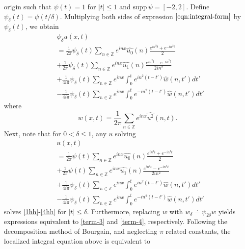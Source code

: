 \documentclass[12pt,reqno]{amsart}
\numberwithin{equation}{section}  %
\newcommand{\zz}{\mathbb{Z}}
\newcommand{\wh}{\widehat}
\begin{document}
origin such that $\psi(t) = 1$ for $|t| \le 1$ and $\text{supp} \, \psi 
= [-2, 2 ]$.
Define $\psi_{\delta}(t) = \psi(t/\delta)$.  Multiplying both sides of expression
$\eqref{eqn:integral-form}$ by $\psi_{\delta}(t)$, we obtain
%
%
\begin{align}
  & \psi_{\delta}u(x,t) 
  \label{1hh}
    \\
    & = \frac{1}{2 \pi}\psi_{\delta}(t)
    \sum_{n \in \zz} e^{inx} \wh{u_{0}}(n) \frac{e^{in^{2}t} + e^{-in^{2}t}}{2} 
    \\
    \label{2hh}
    & + \frac{1}{2 \pi}\psi_{\delta}(t) \sum_{n \in \zz} e^{inx}
    \wh{u_{1}}(n)\frac{e^{in^{2}t} - e^{-in^{2}t}}{2 i n^{2}} 
    \\
    \label{3hh}
    & + \frac{1}{4 i \pi}\psi_{\delta}(t) \sum_{n \in \zz} e^{inx}
    \int_{0}^{t}e^{in^{2}(t-t')}
    \wh{w}(n, t') dt'
    \\
    \label{4hh}
    & - \frac{1}{4 i \pi}\psi_{\delta}(t) \sum_{n \in \zz} e^{inx}
    \int_{0}^{t}e^{-in^{2}(t-t')}
    \wh{w}(n, t') dt'
  \end{align}
where $$w(x,t) = \frac{1}{2\pi} \sum_{n \in \zz}
e^{inx} \wh{u^{2}}(n,t).$$  Next, note that for $0 < \delta \le 1$, any $u$
solving
\begin{align}
  & u(x,t) 
    \\
    & = \frac{1}{2 \pi}\psi(t)
    \sum_{n \in \zz} e^{inx} \wh{u_{0}}(n) \frac{e^{in^{2}t} + e^{-in^{2}t}}{2} 
    \\
    & + \frac{1}{2 \pi}\psi(t) \sum_{n \in \zz} e^{inx}
    \wh{u_{1}}(n)\frac{e^{in^{2}t} - e^{-in^{2}t}}{2 i n^{2}} 
    \\
    \label{term-3}
    & + \frac{1}{4 i \pi} \psi_{\delta}(t) \sum_{n \in \zz} e^{inx}
    \int_{0}^{t}e^{in^{2}(t-t')}
    \wh{w}(n, t') dt'
    \\
    \label{term-4}
    & - \frac{1}{4 i \pi} \psi_{\delta} (t) \sum_{n \in \zz} e^{inx}
    \int_{0}^{t}e^{-in^{2}(t-t')}
    \wh{w}(n, t') dt'
  \end{align}
  solves \eqref{1hh}-\eqref{4hh} for $| t | \le \delta$. Furthermore, replacing
  $w$ with $w_{\delta} \doteq \psi_{2 \delta} w$ yields expressions equivalent
  to \eqref{term-3} and \eqref{term-4}, respectively. 
  Following the decomposition method of Bourgain, and neglecting $\pi$ related
  constants, the localized integral equation above is equivalent to 
%
%
\end{document}
